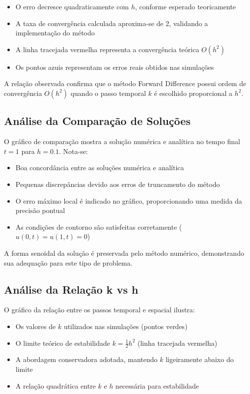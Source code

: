 \documentclass[a4paper, 12pt]{article}
\begin{document}
    \begin{itemize}
        \item O erro decresce quadraticamente com $h$, conforme esperado teoricamente
        \item A taxa de convergência calculada aproxima-se de 2, validando a implementação do método
        \item A linha tracejada vermelha representa a convergência teórica $O(h^2)$
        \item Os pontos azuis representam os erros reais obtidos nas simulações
    \end{itemize}

    A relação observada confirma que o método Forward Difference possui ordem de convergência $O(h^2)$ quando o passo temporal $k$ é escolhido proporcional a $h^2$.

    \subsection{Análise da Comparação de Soluções}

    O gráfico de comparação mostra a solução numérica e analítica no tempo final $t = 1$ para $h = 0.1$. Nota-se:

    \begin{itemize}
        \item Boa concordância entre as soluções numérica e analítica
        \item Pequenas discrepâncias devido aos erros de truncamento do método
        \item O erro máximo local é indicado no gráfico, proporcionando uma medida da precisão pontual
        \item As condições de contorno são satisfeitas corretamente ($u(0,t) = u(1,t) = 0$)
    \end{itemize}

    A forma senoidal da solução é preservada pelo método numérico, demonstrando sua adequação para este tipo de problema.

    \subsection{Análise da Relação k vs h}

    O gráfico da relação entre os passos temporal e espacial ilustra:

    \begin{itemize}
        \item Os valores de $k$ utilizados nas simulações (pontos verdes)
        \item O limite teórico de estabilidade $k = \frac{1}{2}h^2$ (linha tracejada vermelha)
        \item A abordagem conservadora adotada, mantendo $k$ ligeiramente abaixo do limite
        \item A relação quadrática entre $k$ e $h$ necessária para estabilidade
    \end{itemize}
\end{document}
